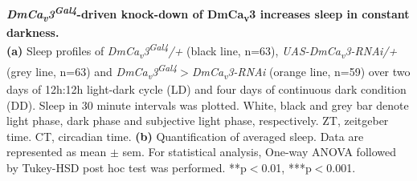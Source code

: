 \label{fig:S3}
\textbf{\emph{DmCa\textsubscript{v}3\textsuperscript{Gal4}}-driven knock-down of DmCa\textsubscript{v}3 increases sleep in constant darkness.}
\\
\textbf{(a)} Sleep profiles of \emph{DmCa\textsubscript{v}3\textsuperscript{Gal4}/+} (black line, n=63), \emph{UAS-DmCa\textsubscript{v}3-RNAi/+} (grey line, n=63) and \emph{DmCa\textsubscript{v}3\textsuperscript{Gal4}$>$DmCa\textsubscript{v}3-RNAi} (orange line, n=59) over two days of 12h:12h light-dark cycle (LD) and four days of continuous dark condition (DD).
Sleep in 30 minute intervals was plotted.
White, black and grey bar denote light phase, dark phase and subjective light phase, respectively.
ZT, zeitgeber time.
CT, circadian time.
\textbf{(b)} Quantification of averaged sleep.
Data are represented as mean $\pm$ sem.
For statistical analysis, One-way ANOVA followed by Tukey-HSD post hoc test was performed.
**p$<$0.01, ***p$<$0.001.
  
  
  
  